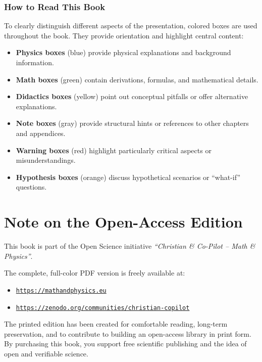 \subsubsection*{How to Read This Book}
To clearly distinguish different aspects of the presentation, colored boxes are used throughout the book. They provide orientation and highlight central content:

\begin{itemize}
	\item \textbf{Physics boxes} (blue) provide physical explanations and background information.
	\item \textbf{Math boxes} (green) contain derivations, formulas, and mathematical details.
	\item \textbf{Didactics boxes} (yellow) point out conceptual pitfalls or offer alternative explanations.
	\item \textbf{Note boxes} (gray) provide structural hints or references to other chapters and appendices.
	\item \textbf{Warning boxes} (red) highlight particularly critical aspects or misunderstandings.
	\item \textbf{Hypothesis boxes} (orange) discuss hypothetical scenarios or “what-if” questions.
\end{itemize}

\section*{Note on the Open-Access Edition}

This book is part of the Open Science initiative \emph{“Christian \& Co-Pilot – Math \& Physics”}.

The complete, full-color PDF version is freely available at:

\begin{itemize}
	\item \href{https://mathandphysics.eu}{\texttt{https://mathandphysics.eu}}
	\item \href{https://zenodo.org/communities/christian-copilot}{\texttt{https://zenodo.org/communities/christian-copilot}}
\end{itemize}
The printed edition has been created for comfortable reading, long-term preservation,  
and to contribute to building an open-access library in print form.  
By purchasing this book, you support free scientific publishing  
and the idea of open and verifiable science.
